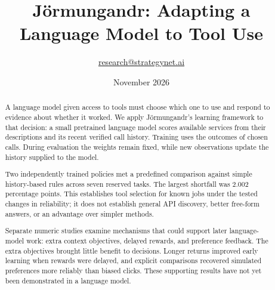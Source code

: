 \documentclass{strategynet-journal}
\title{Jörmungandr: Adapting a Language Model to Tool Use}
\author{\href{mailto:research@strategynet.ai}{research@strategynet.ai}}
\date{November 2026}
\begin{document}
\maketitle
\begin{abstract}
A language model given access to tools must choose which one to use and respond
to evidence about whether it worked. We apply Jörmungandr's learning framework
to that decision: a small pretrained language model scores available services
from their descriptions and its recent verified call history. Training uses
the outcomes of chosen calls. During evaluation the weights remain fixed,
while new observations update the history supplied to the model.

Two independently trained policies met a predefined comparison against simple
history-based rules across seven reserved tasks. The largest shortfall was
2.002 percentage points. This establishes tool selection for known jobs under
the tested changes in reliability; it does not establish general API discovery,
better free-form answers, or an advantage over simpler methods.

Separate numeric studies examine mechanisms that could support later
language-model work: extra context objectives, delayed rewards, and preference
feedback. The extra objectives brought little benefit to decisions. Longer
returns improved early learning when rewards were delayed, and explicit
comparisons recovered simulated preferences more reliably than biased clicks.
These supporting results have not yet been demonstrated in a language model.
\end{abstract}
\SNtwocolumntableofcontents
\end{document}
